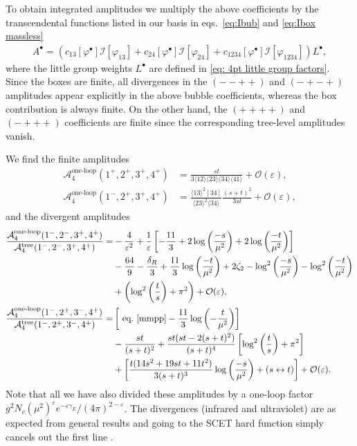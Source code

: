 \documentclass[11pt]{article}
\newcommand{\nn}{\nonumber}
\newcommand{\la}{\langle}
\newcommand{\ra}{\rangle}
\newcommand{\A}{\mathcal{A}}
\newcommand{\vphi}{\varphi}
\newcommand{\vep}{\varepsilon}
\begin{document}
To obtain integrated amplitudes we multiply the above coefficients by the transcendental functions listed in our basis in eqs.~\eqref{eq:Ibub} and \eqref{eq:Ibox massless}
\begin{align}
	A^\bullet = \left( 
			c_{13}[\vphi^\bullet] \mathscr{I}[\vphi_{13}]
			+ c_{24}[\vphi^\bullet] \mathscr{I}[\vphi_{24}]
			+ c_{1234}[\vphi^\bullet] \mathscr{I}[\vphi_{1234}] 
		\right) L^\bullet,
\end{align}
where the little group weights $L^\bullet$ are defined in \eqref{eq: 4pt little group factors}.
Since the boxes are finite, all divergences in the $(--++)$ and $(-+-+)$ amplitudes appear explicitly in the above bubble coefficients, whereas the box contribution is always finite. 
On the other hand, the $(++++)$ and $(-+++)$ coefficients are finite since the corresponding tree-level amplitudes vanish. 

We find the finite amplitudes 
\begin{align}
	\A_4^{\text{one-loop}}(1^+,2^+,3^+,4^+) &
		= \frac{st}{3\la12\ra\la23\ra\la34\ra\la41\ra}
		+ \mathcal{O}(\vep),
	\\
	\A_4^{\text{one-loop}}(1^-,2^+,3^+,4^+)  &
		= \frac{\la13\ra^2[34]}{\la23\ra^2\la34\ra}  \frac{(s+t)^2}{3st} 
		+ \mathcal{O}(\vep), 
\end{align}
and the divergent amplitudes 
\begin{align} \label{mmpp}
		\frac{\A_4^{\text{one-loop}}(1^-,2^-,3^+,4^+)}{\A_4^{\text{tree}}(1^-,2^-,3^+,4^+)} = &
		-\frac{4}{\vep^2} 
		+ \frac{1}{\vep} 
			\left[ 
				-\frac{11}{3} 
				+ 2 \log\bigg(\frac{-s}{\mu^2}\bigg) 
				+ 2 \log\bigg(\frac{-t}{\mu^2}\bigg)
		 	\right]
		\nn\\&
		-\frac{64}{9} 
		- \frac{\delta_R}{3}
		+ \frac{11}{3} \log\bigg(\frac{-t}{\mu^2}\bigg)
		+ 2\zeta_2 
		- \log^2\left(\frac{-s}{\mu^2}\right) - \log^2\left(\frac{-t}{\mu^2}\right)
		\nn\\&
		+ \left(\log^2\bigg(\frac{t}{s}\bigg) + \pi^2\right)
		+ \mathcal{O}(\vep),
\\
\frac{\A_4^{\text{one-loop}}(1^-,2^+,3^-,4^+)}{\A_4^{\text{tree}}(1^-,2^+,3^-,4^+)}  
	=& \left[ 
		\mbox{ eq.~\eqref{mmpp}} 
		- \frac{11}{3} \log\left(-\frac{t}{\mu^2}\right) 
	\right]	 
	\nn\\&
	-\frac{st}{(s+t)^2}
	+ \frac{s t(s t -2(s+t)^2)}{(s+t)^4} 
		\left[\log^2\bigg(\frac{t}{s}\bigg) + \pi^2\right]
	\nn\\&	
	+ \left[
		\frac{t(14s^2+19st+11t^2)}{3(s+t)^3}
		\log\left(\frac{-s}{\mu^2}\right) 
		+ (s\leftrightarrow t)
	\right]
	+ \mathcal{O}(\vep).
\end{align}
Note that all we have also divided these amplitudes by a one-loop factor $g^2N_c(\mu^2)^{\vep}e^{-\vep\gamma_E}/(4\pi)^{2-\vep}$. 
The divergences (infrared and ultraviolet) are as expected from general results and going to the SCET hard function simply cancels out the first line \cite{Becher:2014oda,Feige:2014wja}.
\end{document}
